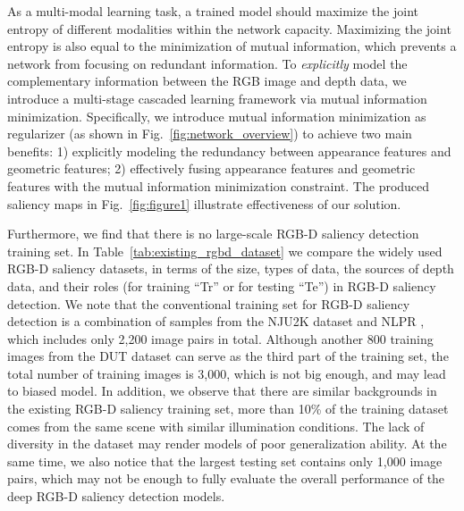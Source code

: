 \documentclass[10pt,twocolumn,letterpaper]{article}
\begin{document}
As a multi-modal learning task, a trained model should maximize the joint entropy of different modalities within the network capacity. Maximizing the joint entropy is also equal to the minimization of mutual information, which prevents a network from focusing on redundant information.
To \textit{explicitly} model the
complementary information between
the RGB image and depth data, we introduce a
multi-stage cascaded learning framework
via mutual information minimization.
Specifically, we introduce
mutual information minimization as regularizer (as shown in Fig.~\ref{fig:network_overview}) to achieve two main benefits: 1) explicitly modeling the redundancy between
appearance features and geometric features;
2) effectively fusing 
appearance features and geometric features with the mutual information minimization constraint.
The produced saliency maps in Fig.~\ref{fig:figure1} illustrate effectiveness of our solution.

















Furthermore, we find that
there is no
large-scale RGB-D saliency detection training set. In Table~\ref{tab:existing_rgbd_dataset} we compare the widely used RGB-D saliency datasets,
in terms of the size,
types of data,
the sources of depth data, and their roles (for training \enquote{Tr} or for testing \enquote{Te}) in RGB-D saliency detection. 
We note that the conventional training set for RGB-D saliency detection is a
combination of samples from the NJU2K \cite{NJU2000} dataset and NLPR \cite{peng2014rgbd}, which includes only 2,200 image pairs in total. Although another 800 training images from the DUT dataset \cite{dmra_iccv19} can serve as the third part of the training set, the total number of training images is 3,000, which is not big enough, and may lead to biased model.
In addition,
we observe that there are
similar backgrounds in the existing RGB-D saliency training set, \eg more than 10\% of the training dataset comes from the same scene with similar illumination conditions.
The lack of diversity in the
dataset may render models of poor generalization ability.
At the same time, we also notice that the largest testing set \cite{sip_dataset} contains only 1,000 image pairs, which may not be enough to fully evaluate the overall performance of the
deep RGB-D saliency detection models.
\end{document}
